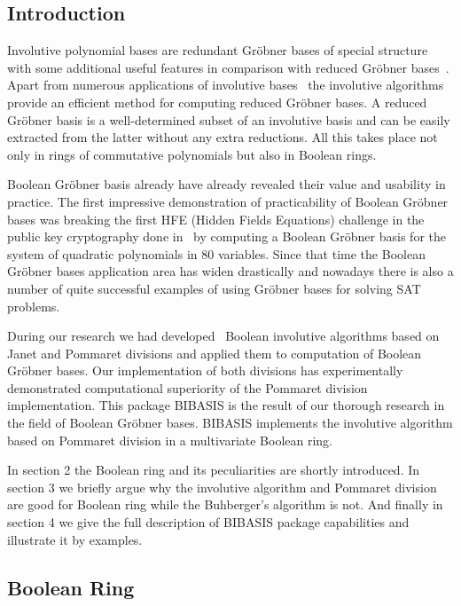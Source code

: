 

\subsection{Introduction}

Involutive polynomial bases are redundant Gr\"obner bases of special structure with some additional useful features in comparison 
with reduced Gr\"obner bases~\cite{Gerdt:98}. Apart from numerous applications of involutive bases~\cite{Seiler:2010} the 
involutive algorithms~\cite{Gerdt:2005} provide an efficient method for computing reduced Gr\"obner bases. A reduced Gr\"obner basis 
is a well-determined subset of an involutive basis and can be easily extracted from the latter without any extra reductions. 
All this takes place not only in rings of commutative polynomials but also in Boolean rings.

Boolean Gr\"obner basis already have already revealed their value and usability in  practice. The first impressive demonstration
of practicability of Boolean Gr\"obner bases was breaking the first HFE (Hidden Fields Equations) challenge in the public
key cryptography done in~\cite{Faugere:2003} by computing a Boolean Gr\"obner basis for the system of quadratic
polynomials in 80 variables. Since that time the Boolean Gr\"obner bases application area has widen drastically and nowadays there 
is also a number of quite successful examples of using Gr\"obner bases for solving SAT problems.

During our research we had developed~\cite{Gerdt:2008, Gerdt:2008a, Gerdt:2010} Boolean involutive algorithms based on Janet and Pommaret 
divisions and applied them to computation of Boolean Gr\"obner bases. Our implementation of both divisions has experimentally 
demonstrated computational superiority of the Pommaret division implementation. This package BIBASIS is the result
of our thorough research in the field of Boolean Gr\"obner bases. BIBASIS implements the involutive algorithm based on Pommaret 
division in a multivariate Boolean ring.

In section 2 the Boolean ring and its peculiarities are shortly introduced. In section 3 we briefly argue  
why the involutive algorithm and Pommaret division are good for Boolean ring while the Buhberger's algorithm is not.
And finally in section 4 we give the full description of BIBASIS package capabilities and illustrate it by examples.

\subsection{Boolean Ring}

